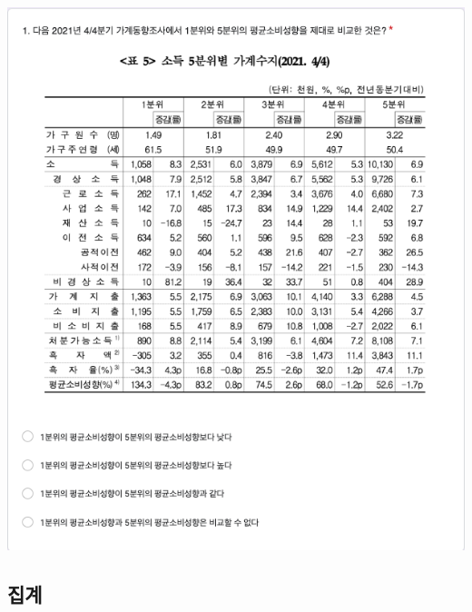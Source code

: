 \documentclass[
]{book}
\begin{document}
\includegraphics[width=0.75\linewidth]{./pics/Quiz230510_Q1}

\subsection{집계}\label{uxc9d1uxacc4-48}
\end{document}
